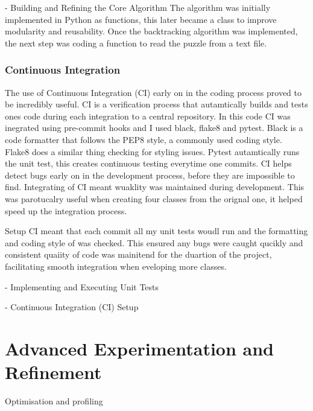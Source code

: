 \documentclass{report}
\begin{document}
- Building and Refining the Core Algorithm
The algorithm was initially implemented in Python as functions, this later became a class to improve modularity and reusability.
Once the backtracking algorithm was implemented, the next step was coding a function to read the puzzle from a text file.

\subsubsection*{Continuous Integration}
The use of Continuous Integration (CI) early on in the coding process proved to be incredibly useful.
CI is a verification process that autamtically builds and tests ones code during each integration to a central repository.
In this code CI was inegrated using pre-commit hooks and I used black, flake8 and pytest.
Black is a code formatter that follows the PEP8 style, a commonly used coding style. Flake8 does a similar thing checking for styling issues.
Pytest autamtically runs the unit test, this creates continuous testing everytime one commits.
CI helps detect bugs early on in the development process, before they are impossible to find.
Integrating of CI meant wuaklity was maintained during development.
This was parotucalry useful when creating four classes from the orignal one, it helped speed up the integration process.

Setup CI meant that each commit all my unit tests woudl run and the formatting and coding style of was checked.
This ensured any bugs were caught qucikly and consistent quaiity of code was mainitend for the duartion of the project,
facilitating smooth integration when eveloping more classes.

- Implementing and Executing Unit Tests

- Continuous Integration (CI) Setup

\section{Advanced Experimentation and Refinement}

Optimisation and profiling
\end{document}
